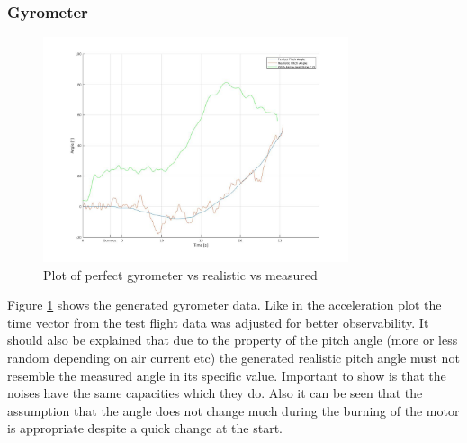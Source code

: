 \subsubsection{Gyrometer}
\begin{figure}[h!]
 \centering
 \includegraphics[width=0.8\textwidth]{./Pictures/PitchPerfVSReal.jpg}
 \caption{Plot of perfect gyrometer vs realistic vs measured}
 \label{fig:PtichPerVSReal}
\end{figure}
Figure \ref{fig:PtichPerVSReal} shows the generated gyrometer data.
Like in the acceleration plot the time vector from the test flight data was adjusted for better observability.
It should also be explained that due to the property of the pitch angle (more or less random depending on air current etc)
the generated realistic pitch angle must not resemble the measured angle in its specific value.
Important to show is that the noises have the same capacities which they do.
Also it can be seen that the assumption that the angle does not change much during the burning of the motor is appropriate despite a quick change at the start.

\newpage
